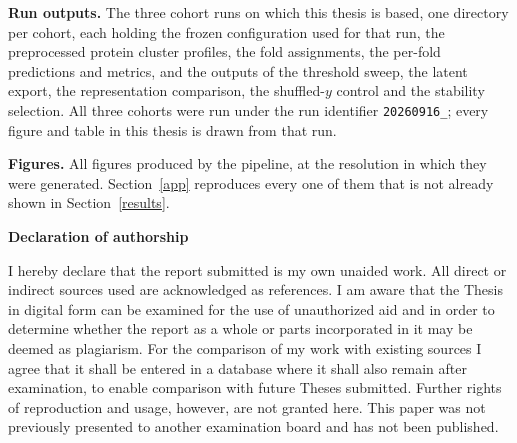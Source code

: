 \documentclass[12pt]{article}
\begin{document}
\textbf{Run outputs.} The three cohort runs on which this thesis is based, one directory per cohort, each
holding the frozen configuration used for that run, the preprocessed protein cluster profiles, the fold assignments, the
per-fold predictions and metrics, and the outputs of the threshold sweep, the latent export, the
representation comparison, the shuffled-$y$ control and the stability selection. All three cohorts were run
under the run identifier \texttt{20260916\_}; every figure and table in this thesis is drawn from that run.

\textbf{Figures.} All figures produced by the pipeline, at the resolution in which they were generated.
Section~\ref{app} reproduces every one of them that is not already shown in Section~\ref{results}.

\newpage


\RaggedRight


\newpage


\Large
\noindent
\textbf{Declaration of authorship}
\vspace{0.5cm}
\noindent
\normalsize

I hereby declare that the report submitted is my own unaided work. All direct
or indirect sources used are acknowledged as references. I am aware that the
Thesis in digital form can be examined for the use of unauthorized aid and in
order to determine whether the report as a whole or parts incorporated in it may
be deemed as plagiarism. For the comparison of my work with existing sources I
agree that it shall be entered in a database where it shall also remain after
examination, to enable comparison with future Theses submitted. Further rights
of reproduction and usage, however, are not granted here. This paper was not
previously presented to another examination board and has not been published.
\\

\vspace{1cm}
\end{document}
